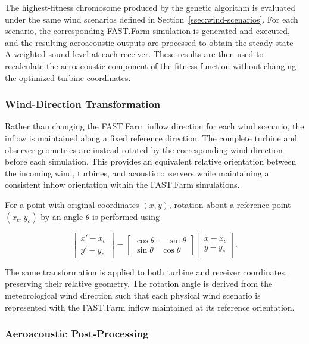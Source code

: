 \documentclass[11pt]{article}
\begin{document}
The highest-fitness chromosome produced by the genetic algorithm is evaluated under the same wind scenarios defined in Section~\ref{ssec:wind-scenarios}. For each scenario, the corresponding FAST.Farm simulation is generated and executed, and the resulting aeroacoustic outputs are processed to obtain the steady-state A-weighted sound level at each receiver. These results are then used to recalculate the aeroacoustic component of the fitness function without changing the optimized turbine coordinates.


\subsubsection{Wind-Direction Transformation}

Rather than changing the FAST.Farm inflow direction for each wind scenario, the inflow is maintained along a fixed reference direction. The complete turbine and observer geometries are instead rotated by the corresponding wind direction before each simulation. This provides an equivalent relative orientation between the incoming wind, turbines, and acoustic observers while maintaining a consistent inflow orientation within the FAST.Farm simulations.

For a point with original coordinates $(x,y)$, rotation about a reference point $(x_c,y_c)$ by an angle $\theta$ is performed using

\begin{equation}
\begin{bmatrix}
x' - x_c \\
y' - y_c
\end{bmatrix}
=
\begin{bmatrix}
\cos\theta & -\sin\theta \\
\sin\theta &  \cos\theta
\end{bmatrix}
\begin{bmatrix}
x - x_c \\
y - y_c
\end{bmatrix}.
\label{eq:openfast-layout-rotation}
\end{equation}

The same transformation is applied to both turbine and receiver coordinates, preserving their relative geometry. The rotation angle is derived from the meteorological wind direction such that each physical wind scenario is represented with the FAST.Farm inflow maintained at its reference orientation.


\subsubsection{Aeroacoustic Post-Processing}
\end{document}
